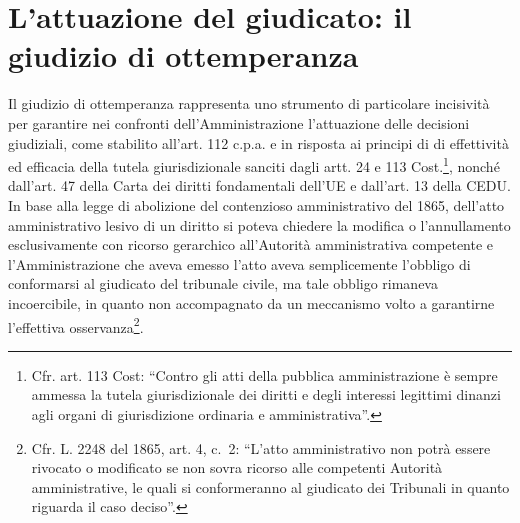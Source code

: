 \documentclass[12pt,it,a4paper,]{report}
\begin{document}
\hypertarget{lattuazione-del-giudicato-il-giudizio-di-ottemperanza}{%
\section{L'attuazione del giudicato: il giudizio di
ottemperanza}\label{lattuazione-del-giudicato-il-giudizio-di-ottemperanza}}

Il giudizio di ottemperanza rappresenta uno strumento di particolare
incisività per garantire nei confronti dell'Amministrazione l'attuazione
delle decisioni giudiziali, come stabilito all'art. 112 c.p.a. e in
risposta ai principi di di effettività ed efficacia della tutela
giurisdizionale sanciti dagli artt. 24 e 113 Cost.\footnote{Cfr. art.
  113 Cost: ``Contro gli atti della pubblica amministrazione è sempre
  ammessa la tutela giurisdizionale dei diritti e degli interessi
  legittimi dinanzi agli organi di giurisdizione ordinaria e
  amministrativa''.}, nonché dall'art. 47 della Carta dei diritti
fondamentali dell'UE e dall'art. 13 della CEDU. In base alla legge di
abolizione del contenzioso amministrativo del 1865, dell'atto
amministrativo lesivo di un diritto si poteva chiedere la modifica o
l'annullamento esclusivamente con ricorso gerarchico all'Autorità
amministrativa competente e l'Amministrazione che aveva emesso l'atto
aveva semplicemente l'obbligo di conformarsi al giudicato del tribunale
civile, ma tale obbligo rimaneva incoercibile, in quanto non
accompagnato da un meccanismo volto a garantirne l'effettiva
osservanza\footnote{Cfr. L. 2248 del 1865, art. 4, c.~2: ``L'atto
  amministrativo non potrà essere rivocato o modificato se non sovra
  ricorso alle competenti Autorità amministrative, le quali si
  conformeranno al giudicato dei Tribunali in quanto riguarda il caso
  deciso''.}.
\end{document}
